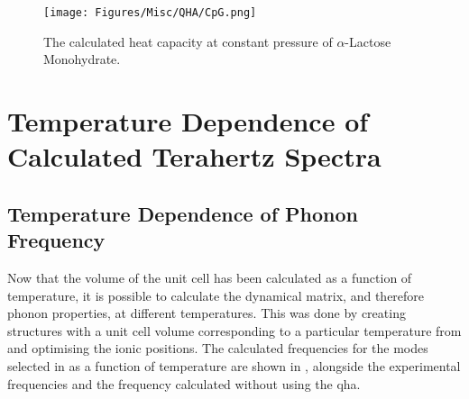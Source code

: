\begin{figure}
\centering
\texttt{[image: Figures/Misc/QHA/CpG.png]}
\captionsetup{font = footnotesize, justification = centering}
\caption[The Calculated Heat Capacity at Constant Pressure of \(\alpha\)-Lactose Monohydrate]{The calculated heat capacity at constant pressure of \(\alpha\)-Lactose Monohydrate.\DIFdelbeginFL {}\DIFdelendFL }
\label{fig:Cp}
\end{figure}

\section{Temperature Dependence of Calculated Terahertz Spectra}
\subsection{Temperature Dependence of Phonon Frequency}
Now that the volume of the unit cell has been calculated as a function of temperature, it is possible to calculate the dynamical matrix, and therefore phonon properties, at different temperatures. This was done by creating structures with a unit cell volume corresponding to a particular temperature from  and optimising the ionic positions. The calculated frequencies for the modes selected in  as a function of temperature are shown in , alongside the experimental frequencies and the frequency calculated without using the \acrshort{qha}.

